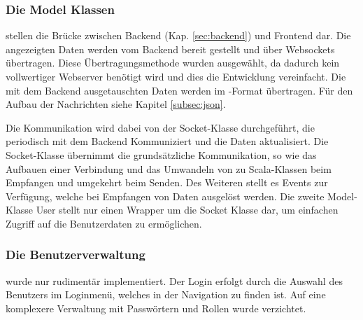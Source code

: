 \FloatBarrier
\subsubsection*{Die Model Klassen}
stellen die Brücke zwischen Backend (Kap. \ref{sec:backend}) und Frontend dar. Die angezeigten Daten werden vom Backend bereit gestellt und über Websockets übertragen. Diese Übertragungsmethode wurden ausgewählt, da dadurch kein vollwertiger Webserver benötigt wird und dies die Entwicklung vereinfacht. Die mit dem Backend ausgetauschten Daten werden im \JSON-Format übertragen. Für den Aufbau der Nachrichten siehe Kapitel \ref{subsec:json}. 

Die Kommunikation wird dabei von der Socket-Klasse durchgeführt, die periodisch mit dem Backend Kommuniziert und die Daten aktualisiert.
Die Socket-Klasse übernimmt die grundsätzliche Kommunikation, so wie das Aufbauen einer Verbindung und das Umwandeln von \JSON zu Scala-Klassen beim Empfangen und umgekehrt beim Senden. Des Weiteren stellt es Events zur Verfügung, welche bei Empfangen von Daten ausgelöst werden.
Die zweite Model-Klasse User stellt nur einen Wrapper um die Socket Klasse dar, um einfachen Zugriff auf die Benutzerdaten zu ermöglichen.

\FloatBarrier
\subsubsection*{Die Benutzerverwaltung}
wurde nur rudimentär implementiert. Der Login erfolgt durch die Auswahl des Benutzers im Loginmenü, welches in der Navigation zu finden ist. Auf eine komplexere Verwaltung mit Passwörtern und Rollen wurde verzichtet.